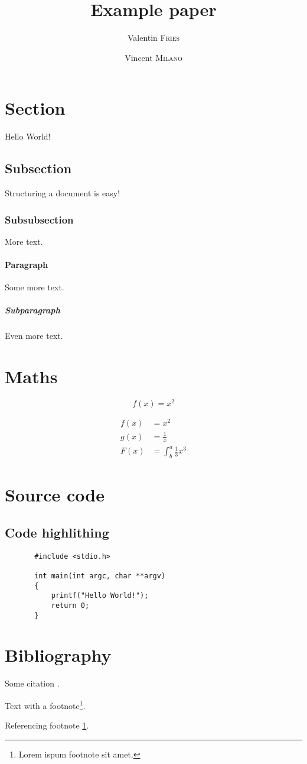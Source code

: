 \documentclass{report}
\title{Example paper}
\author{
    Valentin \textsc{Fries}
    \and
    Vincent \textsc{Milano}
}
\begin{document}
\maketitle

\newpage
\tableofcontents

\newpage
{}

\section{Section}
    Hello World!

    \subsection{Subsection}
    Structuring a document is easy!

        \subsubsection{Subsubsection}
        More text.

        \paragraph{Paragraph}
        Some more text.

            \subparagraph{Subparagraph}
            Even more text.

\section{Maths}
   \begin{equation*}
     f(x) = x^2
   \end{equation*}

   \begin{align*}
     f(x) &= x^2\\
     g(x) &= \frac{1}{x}\\
     F(x) &= \int^a_b \frac{1}{3}x^3
   \end{align*}

\section{Source code}
   \subsection{Code highlithing}
   \begin{lstlisting}
       #include <stdio.h>

       int main(int argc, char **argv)
       {
           printf("Hello World!");
           return 0;
       }
   \end{lstlisting}

\section{Bibliography}
    Some citation \cite{some_reference}.

    Text with a footnote\footnote{\label{testfootnote}Lorem ispum footnote sit amet.}.

    Referencing footnote \ref{testfootnote}.

\newpage



\end{document}
